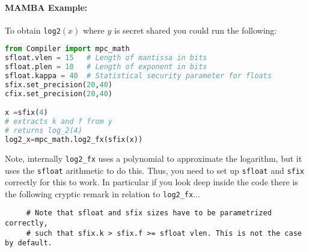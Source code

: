 \paragraph{MAMBA Example:} To obtain \verb|log2|$(x)$ where $y$ is secret shared you could run the following:
\begin{lstlisting}[language={python}]
from Compiler import mpc_math
sfloat.vlen = 15   # Length of mantissa in bits
sfloat.plen = 10   # Length of exponent in bits
sfloat.kappa = 40  # Statistical security parameter for floats
sfix.set_precision(20,40)
cfix.set_precision(20,40)

x =sfix(4)
# extracts k and f from y
# returns log_2(4)
log2_x=mpc_math.log2_fx(sfix(x))
\end{lstlisting}
Note, internally \verb+log2_fx+ uses a polynomial to approximate the logarithm, but it uses the \verb+sfloat+ arithmetic to do this.
Thus, you need to set up \verb+sfloat+ and \verb+sfix+ correctly for this to work.
In particular if you look deep inside the code there is the following cryptic remark in relation to \verb+log2_fx+...
\begin{verbatim}
     # Note that sfloat and sfix sizes have to be parametrized correctly,
     # such that sfix.k > sfix.f >= sfloat vlen. This is not the case by default.
\end{verbatim}


